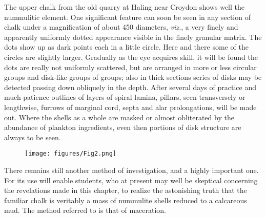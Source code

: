 \documentclass[a4paper, 12pt, oneside]{article}
\begin{document}
The upper chalk from the old quarry at Haling near Croydon shows well the nummulitic element. One significant feature can soon be seen in any section of chalk under a magnification of about 450 diameters, \emph{viz.}, a very finely and apparently uniformly dotted appearance visible in the finely granular matrix. The dots show up as dark points each in a little circle. Here and there some of the circles are slightly larger. Gradually as the eye acquires skill, it will be found the dots are really not uniformly scattered, but are arranged in more or less circular groups and disk-like groups of groups; also in thick sections series of disks may be detected passing down obliquely in the depth. After several days of practice and much patience outlines of layers of spiral lamina, pillars, seen transversely or lengthwise, furrows of marginal cord, septa and alar prolongations, will be made out. Where the shells as a whole are masked or almost obliterated by the abundance of plankton ingredients, even then portions of disk structure are always to be seen.
\begin{figure}[H]
\centering
\texttt{[image: figures/Fig2.png]}
\caption*{}
\end{figure}
There remains still another method of investigation, and a highly important one. For its use will enable students, who at present may well be skeptical concerning the revelations made in this chapter, to realize the astonishing truth that the familiar chalk is veritably a mass of nummulite shells reduced to a calcareous mud. The method referred to is that of maceration.
\end{document}
